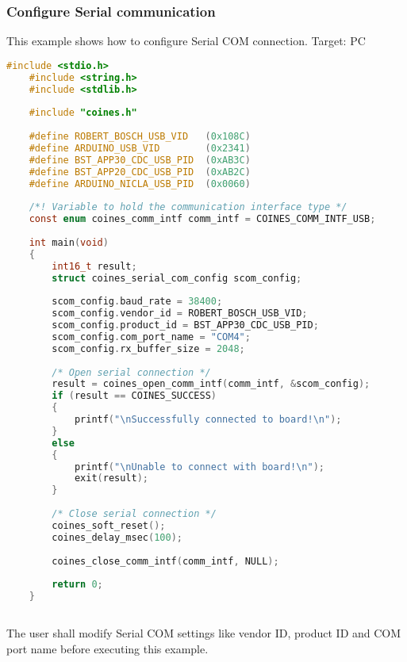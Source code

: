 \documentclass{article}
\begin{document}
\subsubsection{Configure Serial communication}\label{serialComConfig}
This example shows how to configure Serial COM connection.
\newline Target: PC
\begin{lstlisting}[language=c]
	#include <stdio.h>
	#include <string.h>
	#include <stdlib.h>
	
	#include "coines.h"
	
	#define ROBERT_BOSCH_USB_VID   (0x108C)
	#define ARDUINO_USB_VID        (0x2341)
	#define BST_APP30_CDC_USB_PID  (0xAB3C)
	#define BST_APP20_CDC_USB_PID  (0xAB2C)
	#define ARDUINO_NICLA_USB_PID  (0x0060)
	
	/*! Variable to hold the communication interface type */
	const enum coines_comm_intf comm_intf = COINES_COMM_INTF_USB;
	
	int main(void)
	{
		int16_t result;
		struct coines_serial_com_config scom_config;
	
		scom_config.baud_rate = 38400;
		scom_config.vendor_id = ROBERT_BOSCH_USB_VID;
		scom_config.product_id = BST_APP30_CDC_USB_PID;
		scom_config.com_port_name = "COM4";
		scom_config.rx_buffer_size = 2048;
	
		/* Open serial connection */
		result = coines_open_comm_intf(comm_intf, &scom_config);
		if (result == COINES_SUCCESS)
		{
			printf("\nSuccessfully connected to board!\n");
		}
		else
		{
			printf("\nUnable to connect with board!\n");
			exit(result);
		}
	
		/* Close serial connection */
		coines_soft_reset();
		coines_delay_msec(100);
	
		coines_close_comm_intf(comm_intf, NULL);
	
		return 0;
	}
	
\end{lstlisting}
The user shall modify Serial COM settings like vendor ID, product ID and COM port name before executing this example.
\end{document}
